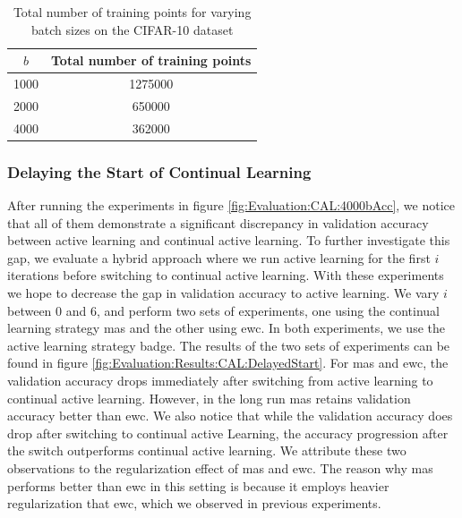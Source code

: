 \begin{table}[h]
    \centering
    \begin{tabular}{c | c } 
        $b$ & Total number of training points \\
        \hline 
        1000 & 1275000 \\
        2000 & 650000 \\
        4000 & 362000 \\
    \end{tabular}
    \caption{Total number of training points for varying batch sizes on the CIFAR-10 dataset}
    \label{fig:NumberOfTrainingPoints}
\end{table}


\subsubsection{Delaying the Start of Continual Learning}
\label{sec:Evaluation:Results:CAL:Hybrid}
After running the experiments in figure \ref{fig:Evaluation:CAL:4000bAcc}, we notice that all of them demonstrate a significant discrepancy in validation accuracy
between active learning and continual active learning. To further investigate this gap, we evaluate a hybrid approach where we run active learning for the first $i$
iterations before switching to continual active learning. With these experiments we hope to decrease the gap in validation accuracy to active learning. We vary $i$
between 0 and 6, and perform two sets of experiments, one using the continual learning strategy \gls{mas} and the other using \gls{ewc}. In both experiments, we use
the active learning strategy \gls{badge}. The results of the two sets of experiments can be found in figure  \ref{fig:Evaluation:Results:CAL:DelayedStart}. For \gls{mas}
and \gls{ewc}, the validation accuracy drops immediately after switching from active learning to continual active learning. However, in the long run \gls{mas}
retains validation accuracy better than \gls{ewc}. We also notice that while the validation accuracy does drop after switching to continual active Learning, the accuracy
progression after the switch outperforms continual active learning. We attribute these two observations to the regularization effect of \gls{mas} and \gls{ewc}. 
The reason why \gls{mas} performs better than \gls{ewc} in this setting is because it employs heavier regularization that \gls{ewc}, which we observed in previous
experiments. \par

